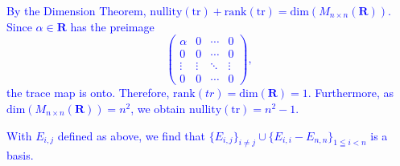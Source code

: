 \documentclass[a4paper,11pt]{article}
\newcommand{\R}{\mathbf{R}}
\newcommand{\ddim}{\text{dim}}
\newcommand{\BB}[1]{\textcolor{blue}{#1}}
\newcommand{\tr}{\text{tr}}
\begin{document}
\begin{enumerate}[(a)]
    \BB{By the Dimension Theorem,
      $\text{nullity}(\tr)+\text{rank}(\tr)=\ddim(M_{n \times n}(\R))$. Since
      $\alpha \in \R$ has the preimage
      \[
        \begin{pmatrix}
          \alpha & 0 & \cdots & 0 \\
          0 & 0 & \cdots & 0 \\
          \vdots & \vdots & \ddots & \vdots \\
          0 & 0 & \cdots & 0
        \end{pmatrix},
      \]
    the trace map is onto. Therefore, $\text{rank}(tr)=\ddim(\R)=1$.
    Furthermore, as $\ddim(M_{n \times n}(\R))=n^2$, we obtain
    $\text{nullity}(\tr)=n^2-1$.}

  \BB{With $E_{i,j}$ defined as above, we find that $\{E_{i,j}\}_{i \neq
      j}\cup\{E_{i,i}-E_{n,n}\}_{1 \leqq i < n}$ is a basis. \\}
\end{enumerate}
\end{document}

